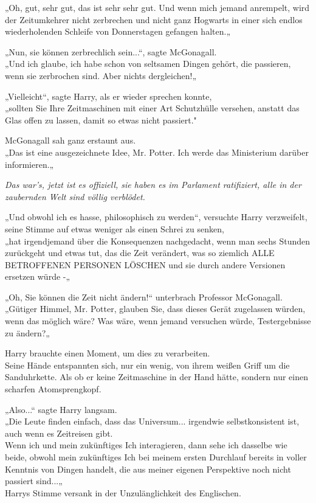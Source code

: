 {„Oh, gut, sehr gut, das ist sehr sehr gut. Und wenn mich jemand anrempelt, wird der Zeitumkehrer nicht zerbrechen und nicht ganz Hogwarts in einer sich endlos wiederholenden Schleife von Donnerstagen gefangen halten.„

„Nun, sie können zerbrechlich sein...“, sagte McGonagall.\\ „Und ich glaube, ich habe schon von seltsamen Dingen gehört, die passieren, wenn sie zerbrochen sind. Aber nichts dergleichen!„

„Vielleicht“, sagte Harry, als er wieder sprechen konnte,\\ „sollten Sie Ihre Zeitmaschinen mit einer Art Schutzhülle versehen, anstatt das Glas offen zu lassen, damit so etwas nicht passiert."

McGonagall sah ganz erstaunt aus.\\ „Das ist eine ausgezeichnete Idee, Mr. Potter. Ich werde das Ministerium darüber informieren.„

\emph{Das war's, jetzt ist es offiziell, sie haben es im Parlament ratifiziert, alle in der zaubernden Welt sind völlig verblödet.}

„Und obwohl ich es hasse, philosophisch zu werden“, versuchte Harry verzweifelt, seine Stimme auf etwas weniger als einen Schrei zu senken,\\ „hat irgendjemand über die Konsequenzen nachgedacht, wenn man sechs Stunden zurückgeht und etwas tut, das die Zeit verändert, was so ziemlich ALLE BETROFFENEN PERSONEN LÖSCHEN und sie durch andere Versionen ersetzen würde -„

„Oh, Sie können die Zeit nicht ändern!“ unterbrach Professor McGonagall.\\ „Gütiger Himmel, Mr. Potter, glauben Sie, dass dieses Gerät zugelassen würden, wenn das möglich wäre? Was wäre, wenn jemand versuchen würde, Testergebnisse zu ändern?„

Harry brauchte einen Moment, um dies zu verarbeiten.\\ Seine Hände entspannten sich, nur ein wenig, von ihrem weißen Griff um die Sanduhrkette. Als ob er keine Zeitmaschine in der Hand hätte, sondern nur einen scharfen Atomsprengkopf.

„Also...“ sagte Harry langsam.\\ „Die Leute finden einfach, dass das Universum... irgendwie selbstkonsistent ist, auch wenn es Zeitreisen gibt.\\ Wenn ich und mein zukünftiges Ich interagieren, dann sehe ich dasselbe wie beide, obwohl mein zukünftiges Ich bei meinem ersten Durchlauf bereits in voller Kenntnis von Dingen handelt, die aus meiner eigenen Perspektive noch nicht passiert sind...„\\ Harrys Stimme versank in der Unzulänglichkeit des Englischen.

}

